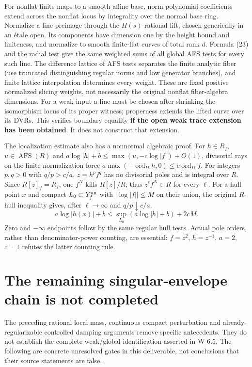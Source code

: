 \documentclass[
  11pt,
]{article}
\begin{document}
For nonflat finite maps to a smooth affine base, norm-polynomial
coefficients extend across the nonflat locus by integrality over the
normal base ring. Normalize a line preimage through the
\(H(s)\)-rational lift, chosen generically in an étale open. Its
components have dimension one by the height bound and finiteness, and
normalize to smooth finite-flat curves of total rank \(d\). Formula (23)
and the radial test give the same weighted sums of all global AFS tests
for every such line. The difference lattice of AFS tests separates the
finite analytic fiber (use truncated distinguishing regular norms and
low generator branches), and finite lattice interpolation determines
every weight. These are fixed positive normalized slicing weights, not
necessarily the original nonflat fiber-algebra dimensions. For a weak
input a line must be chosen after shrinking the isomorphism locus of its
proper witness; properness extends the lifted curve over its DVRs. This
verifies boundary equality \textbf{if the open weak trace extension has
been obtained}. It does not construct that extension.

The localization estimate also has a nonnormal algebraic proof. For
\(h\in R_f\), \(u\in\operatorname{AFS}(R)\) and
\(a\log|h|+b\le\max(u,-c\log|f|)+O(1)\), divisorial rays on the finite
normalization force
\(a\max(-\operatorname{ord}_D h,0)\le c\operatorname{ord}_D f\). For
integers \(p,q>0\) with \(q/p>c/a\), \(z=h^pf^q\) has no divisorial
poles and is integral over \(R\). Since \(R[z]_f=R_f\), one \(f^N\)
kills \(R[z]/R\); thus \(z^\ell f^N\in R\) for every \(\ell\). For a
hull point \(x\) and compact \(L_0\subset Y_f^{\rm an}\) with
\(|\log|f||\le M\) on their union, the original \(R\)-hull inequality
gives, after \(\ell\to\infty\) and \(q/p\downarrow c/a\),
\[a\log|h(x)|+b\le\sup_{L_0}(a\log|h|+b)+2cM. \tag{24}\] Zero and
\(-\infty\) endpoints follow by the same regular hull tests. Actual pole
orders, rather than denominator-power counting, are essential:
\(f=z^2\), \(h=z^{-1}\), \(a=2\), \(c=1\) refutes the latter counting
rule.

\section{The remaining singular-envelope chain is not
completed}\label{the-remaining-singular-envelope-chain-is-not-completed}

The preceding rational local mass, continuous compact perturbation and
already-regularizable controlled damping arguments remove specific
antecedents. They do not establish the complete weak/global
identification asserted in W 6.5. The following are concrete unresolved
gates in this deliverable, not conclusions that their source statements
are false.
\end{document}
